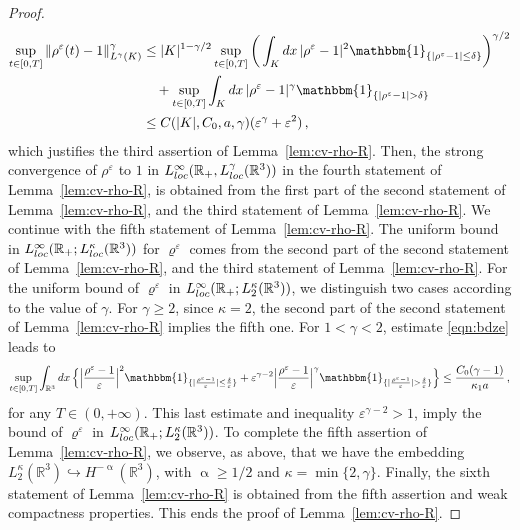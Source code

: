 \documentclass[10pt,a4paper]{amsart}
\def \R{{\mathbb{R}}}
\begin{document}
\begin{proof}
\begin{align*}
 \sup_{t\in [0,T]} \|\rho^\varepsilon(t) -1\|_{L^\gamma(K)}^\gamma
  & \leq |K|^{1-\gamma/2}  \sup_{t\in [0,T]} \bigg(\int_K dx\, |\rho^\varepsilon -1|^2
  \mathbbm{1}_{\{|{\rho^\varepsilon-1}|\leq \delta\}} \bigg)^{\gamma/2} \\
  & \quad + \sup_{t\in [0,T]} \int_K dx\, |\rho^\varepsilon -1|^\gamma
\mathbbm{1}_{\{|{\rho^\varepsilon-1}|> \delta\}} \\
& \leq C(|K|, C_0,  a,  \gamma) (\varepsilon^\gamma + \varepsilon^2) \,,
\end{align*}
which justifies the third assertion of Lemma~\ref{lem:cv-rho-R}. Then, the strong convergence of $\rho^\varepsilon$ to $1$ in $L_{\rm loc}^\infty(\R_+, L_{\rm loc}^\gamma(\R^3))$ in the fourth statement of Lemma~\ref{lem:cv-rho-R}, is obtained from the first part of the second statement of Lemma~\ref{lem:cv-rho-R}, and the third statement of Lemma~\ref{lem:cv-rho-R}. We continue with the fifth statement of Lemma~\ref{lem:cv-rho-R}. The uniform bound in $L_{\rm loc}^\infty(\R_+; L_{\rm loc }^\kappa(\R^3))$ for $\varrho^\varepsilon$ comes from the second part of the second statement of Lemma~\ref{lem:cv-rho-R}, and the third statement of Lemma~\ref{lem:cv-rho-R}. For the uniform  bound of  $\varrho^\varepsilon$ in $L_{\rm loc}^\infty(\R_+; L_2^\kappa(\R^3))$, we distinguish two cases according to the value of $\gamma$. For $\gamma \geq 2$, since $\kappa=2$, the second part of the second statement of Lemma~\ref{lem:cv-rho-R} implies the fifth one. For $1<\gamma <2$, estimate \eqref{eqn:bdze} leads to
\[
\sup_{t\in[0,T]}  \int_{\R^3}dx \, \Big\{ \Big|\frac{\rho^\varepsilon-1}{\varepsilon}\Big|^2
\mathbbm{1}_{\{|\frac{\rho^\varepsilon-1}{\varepsilon}|\leq \frac{ \delta}{\varepsilon}\}} + 
\varepsilon^{\gamma-2}\Big|\frac{\rho^\varepsilon-1}{\varepsilon}\Big|^\gamma
\mathbbm{1}_{\{|\frac{\rho^\varepsilon-1}{\varepsilon}|> \frac{ \delta}{\varepsilon}\}}
\Big\} \leq \frac{C_0(\gamma-1)}{\kappa_1 a}\,,
\]
for any $T\in (0,+\infty)$. This last  estimate and  inequality $\varepsilon^{\gamma-2}>1$, imply the bound of $\varrho^\varepsilon$ in $L_{\rm loc}^\infty(\R_+; L_2^\kappa(\R^3))$. To complete the fifth assertion of Lemma~\ref{lem:cv-rho-R}, we observe, as above, that we have the embedding $L_2^\kappa(\R^3) \hookrightarrow H^{-\upalpha}(\R^3)$, with $\upalpha \geq 1/2$ and $\kappa=\min\{2,\gamma\}$. Finally, the sixth statement of Lemma~\ref{lem:cv-rho-R} is obtained from the fifth assertion and weak compactness properties. This ends the proof of Lemma~\ref{lem:cv-rho-R}.
\end{proof}  
\end{document}

